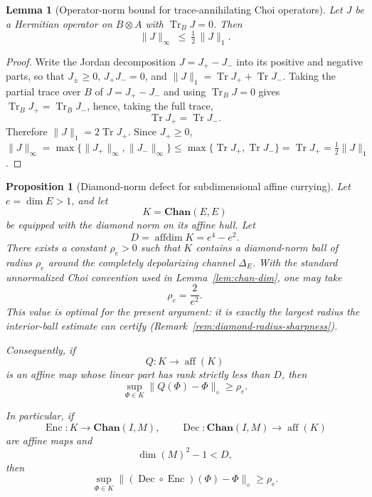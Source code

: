 \documentclass[11pt]{article}
\newtheorem{proposition}[theorem]{Proposition}
\newtheorem{lemma}[theorem]{Lemma}
\DeclareMathOperator{\affdim}{affdim}
\DeclareMathOperator{\aff}{aff}
\DeclareMathOperator{\Tr}{Tr}
\begin{document}
\begin{lemma}[Operator-norm bound for trace-annihilating Choi operators]
\label{lem:ta-choi-half}
Let $J$ be a Hermitian operator on $B\otimes A$ with $\Tr_B J=0$. Then
\[
\|J\|_\infty\ \le\ \tfrac12\,\|J\|_1 .
\]
\end{lemma}

\begin{proof}
Write the Jordan decomposition $J=J_+-J_-$ into its positive and negative
parts, so that $J_\pm\ge0$, $J_+J_-=0$, and $\|J\|_1=\Tr J_++\Tr J_-$. Taking
the partial trace over $B$ of $J=J_+-J_-$ and using $\Tr_B J=0$ gives
$\Tr_B J_+=\Tr_B J_-$, hence, taking the full trace,
\[
\Tr J_+=\Tr J_- .
\]
Therefore $\|J\|_1=2\Tr J_+$. Since $J_+\ge0$,
$\|J\|_\infty=\max\{\|J_+\|_\infty,\|J_-\|_\infty\}\le\max\{\Tr J_+,\Tr J_-\}
=\Tr J_+=\tfrac12\|J\|_1$.
\end{proof}

\begin{proposition}[Diamond-norm defect for subdimensional affine currying]
\label{prop:chan-diamond-defect}
Let $e=\dim E>1$, and let
\[
K=\mathbf{Chan}(E,E)
\]
be equipped with the diamond norm on its affine hull. Let
\[
D=\affdim K=e^4-e^2.
\]
There exists a constant $\rho_e>0$ such that $K$ contains a diamond-norm ball
of radius $\rho_e$ around the completely depolarizing channel $\Delta_E$.
With the standard unnormalized Choi convention used in
Lemma~\ref{lem:chan-dim}, one may take
\[
\rho_e=\frac2{e^2}.
\]
This value is optimal for the present argument: it is exactly the largest
radius the interior-ball estimate can certify
(Remark~\ref{rem:diamond-radius-sharpness}).

Consequently, if
\[
Q:K\longrightarrow \aff(K)
\]
is an affine map whose linear part has rank strictly less than $D$, then
\[
\sup_{\Phi\in K}\|Q(\Phi)-\Phi\|_\diamond
\ge
\rho_e.
\]

In particular, if
\[
\operatorname{Enc}:K\longrightarrow \mathbf{Chan}(I,M),
\qquad
\operatorname{Dec}:\mathbf{Chan}(I,M)\longrightarrow \aff(K)
\]
are affine maps and
\[
\dim(M)^2-1<D,
\]
then
\[
\sup_{\Phi\in K}
\|(\operatorname{Dec}\circ\operatorname{Enc})(\Phi)-\Phi\|_\diamond
\ge
\rho_e.
\]
\end{proposition}
\end{document}
